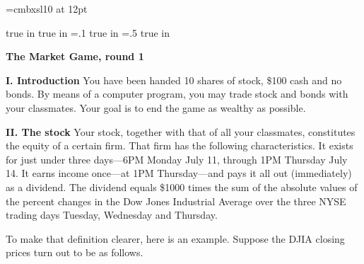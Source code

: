 \twelvepoint
\def\interline{12pt}
\font\bfsl=cmbxsl10 at 12pt

\newcount\notenumber
\def\clearnotenumber{\notenumber=0\relax}
\def\note#1{%
  \advance\notenumber by 1\baselineskip=12pt
  \footnote{$^{\the\notenumber}$}{{\tenpoint #1\vskip -12pt}}
  \baselineskip=\interline}
\clearnotenumber

\def\section#1{\vskip 4pt\noindent
  {\baselineskip 9pt\relax\bf#1}\vskip 0pt\noindent}
\def\subsection#1{\vskip 4pt\noindent
  {\baselineskip 9pt\relax\bfsl#1}\vskip 0pt\noindent}

\parskip=4pt
\baselineskip=\interline
{} true in
 true in\relax
\hoffset=.1 true in
\voffset=.5 true in


\centerline{{\bf The Market Game, round 1}}

\section{I. Introduction}%
You have been handed 10 shares of stock, \$100 cash and no bonds.  By means of
a computer program, you may trade stock and bonds with your
classmates.  Your goal is to end the game as wealthy as possible.

\section{II. The stock}%
Your stock, together with that of all your classmates, constitutes
the equity of a certain firm.  That firm has the following
characteristics.  It exists for just under three days---6PM Monday July
11, through 1PM Thursday July 14.  It earns income once---at 1PM
Thursday---and pays it all out (immediately) as a dividend.  The
dividend equals \$1000 times the sum of the absolute values of the
percent changes in the Dow Jones Industrial Average over the three
NYSE trading days Tuesday, Wednesday and Thursday.

To make that definition clearer, here is an example.  Suppose the
DJIA closing prices turn out to be as follows.

